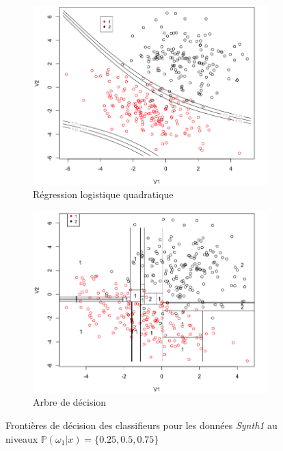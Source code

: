 \documentclass[a4paper,10pt]{report}
\begin{document}
\begin{figure}[H]
\begin{subfigure}[b]{0.45\linewidth}
	\end{subfigure}\\%
	\begin{subfigure}[b]{0.45\linewidth}
		\centering
		\captionsetup{justification=centering, margin=1cm}
		\includegraphics[width=1\linewidth]{img/front-decision-synth-1-reg-log-quad}
		\caption{\small Régression logistique quadratique}
		\label{fig:front-decision-synth-1-reg-log-quad}%
	\end{subfigure}%
	\begin{subfigure}[b]{0.45\linewidth}
		\centering
		\captionsetup{justification=centering, margin=1cm}
		\includegraphics[width=1\linewidth]{img/front-decision-synth-1-tree}
		\caption{\small Arbre de décision}
		\label{fig:front-decision-synth-1-tree}%
	\end{subfigure}%
	\caption{\small Frontières de décision des classifieurs pour les données \textit{Synth1} au niveaux $\mathbb{P}(\omega_1|x) = \{0.25, 0.5, 0.75\}$}
	\label{fig:front-decision-synth-1}%
\end{figure}
\end{document}
